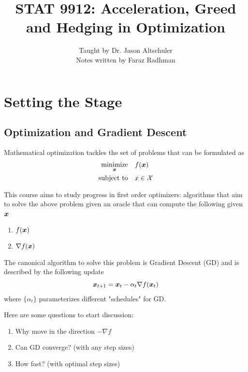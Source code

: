 \documentclass[11pt]{article}
\title{STAT 9912: Acceleration, Greed and Hedging in Optimization}
\author{Taught by Dr. Jason Altschuler \\ Notes written by Faraz Radhman}
\date{}
\begin{document}
\maketitle

\tableofcontents
\newpage

\section{Setting the Stage}
\subsection{Optimization and Gradient Descent}
Mathematical optimization tackles the set of problems that can be formulated as 
\begin{align*}
	\operatorname*{minimize}_{\bm{x}} &\quad f(\bm{x}) \\ 
	\operatorname{subject\ to} &\quad x \in \mathcal{X}
\end{align*} 

This course aims to study progress in first order optimizers: algorithms that aim to solve the above problem given an oracle that can compute the following given $\bm{x}$
\begin{enumerate}
\item $f(\bm{x})$
\item $\nabla f(\bm{x})$
\end{enumerate}

The canonical algorithm to solve this problem is Gradient Descent (GD) and is described by the following update
\[\bm{x}_{t+1} = \bm{x}_t -\alpha_t \nabla f(\bm{x}_t)\]
where $\{\alpha_t\}$ parameterizes different "schedules" for GD.

Here are some questions to start discussion:

\begin{enumerate}[label=Q\arabic*)]
\item Why move in the direction $-\nabla f$
\item Can GD converge? (with any step sizes)
\item How fast? (with optimal step sizes)
\end{enumerate}
\end{document}
